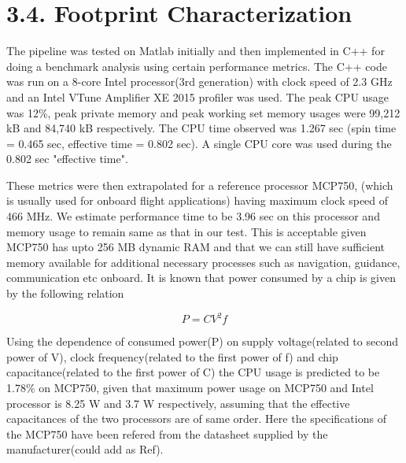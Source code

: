 \documentclass{article}
\title{}
\author{}
\date{\vspace{-5ex}}
\begin{document}
	\maketitle
	
	\section*{3.4. Footprint Characterization}
The pipeline was tested on Matlab initially and then implemented in C++ for doing a benchmark analysis using certain performance metrics. The C++ code was run on a 8-core Intel processor(3rd generation) with clock speed of 2.3 GHz and an Intel VTune Amplifier XE 2015 profiler was used. The peak CPU usage was 12\%, peak private memory and peak working set memory usages were 99,212 kB and 84,740 kB respectively. The CPU time observed was 1.267 sec (spin time = 0.465 sec, effective time = 0.802 sec). A single CPU core was used during the 0.802 sec "effective time". \newline

These metrics were then extrapolated for a reference processor MCP750, (which is usually used for onboard flight applications)  having maximum clock speed of 466 MHz. We estimate performance time to be 3.96 sec on this processor and memory usage to remain same as that in our test.  This is acceptable given MCP750 has upto 256 MB dynamic RAM and that we can still have sufficient memory available for additional necessary processes such as navigation, guidance, communication etc onboard. It is known that power consumed by a chip is given by the following relation

\begin{equation}
P=CV^{2}f
\end{equation}



Using the dependence of consumed power(P) on supply voltage(related to second power of V), clock frequency(related to the first power of f) and chip capacitance(related to the first power of C) the CPU usage is predicted to be 1.78\% on MCP750, given that maximum power usage on MCP750 and Intel processor is 8.25 W and 3.7 W respectively, assuming that the effective capacitances of the two processors are of same order. Here the specifications of the MCP750 have been refered from the datasheet supplied by the manufacturer(could add as Ref). 


	
\end{document}
